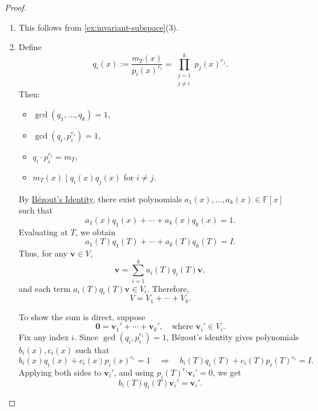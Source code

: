 \begin{proof}
\begin{enumerate}
    \item This follows from \autoref{ex:invariant-subspace}(3).

    \item Define
    \[
    q_i(x) := \frac{m_T(x)}{p_i(x)^{e_i}} = \prod_{\substack{j = 1 \\ j \neq i}}^k p_j(x)^{e_j}.
    \]
    Then:
    \begin{itemize}
        \item \(\gcd(q_1, \dots, q_k) = 1\),
        \item \(\gcd(q_i, p_i^{e_i}) = 1\),
        \item \(q_i \cdot p_i^{e_i} = m_T\),
        \item \(m_T(x) \mid q_i(x) q_j(x)\) for \(i \neq j\).
    \end{itemize}

    By \hyperref[cor:bezout]{Bézout’s Identity}, there exist polynomials \(a_1(x), \dots, a_k(x) \in \mathbb{F}[x]\) such that
    \begin{equation}\label{eq:bezout-decomp}
        a_1(x) q_1(x) + \cdots + a_k(x) q_k(x) = 1.
    \end{equation}
    Evaluating at \(T\), we obtain
    \[
    a_1(T) q_1(T) + \cdots + a_k(T) q_k(T) = I.
    \]
    Thus, for any \(\mathbf{v} \in V\),
    \begin{equation}\label{eq:v-sum}
        \mathbf{v} = \sum_{i=1}^k a_i(T) q_i(T) \mathbf{v},
    \end{equation}
    and each term \(a_i(T) q_i(T) \mathbf{v} \in V_i\). Therefore,
    \begin{equation}
        V = V_1 + \cdots + V_k. \label{eq:v-sum-plain}
    \end{equation}

    To show the sum is direct, suppose
    \begin{equation}
        \mathbf{0} = \mathbf{v}_1' + \cdots + \mathbf{v}_k', \quad \text{where } \mathbf{v}_i' \in V_i. \label{eq:zero-sum}
    \end{equation}
    Fix any index \(i\). Since \(\gcd(q_i, p_i^{e_i}) = 1\), Bézout’s identity gives polynomials \(b_i(x), c_i(x)\) such that
    \[
    b_i(x) q_i(x) + c_i(x) p_i(x)^{e_i} = 1 \quad \Rightarrow \quad b_i(T) q_i(T) + c_i(T) p_i(T)^{e_i} = I.
    \]
    Applying both sides to \(\mathbf{v}_i'\), and using \(p_i(T)^{e_i} \mathbf{v}_i' = 0\), we get
    \[
    b_i(T) q_i(T) \mathbf{v}_i' = \mathbf{v}_i'.
    \]


\end{enumerate}
\end{proof}
